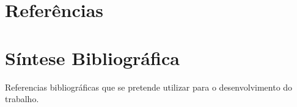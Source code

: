 \documentclass[
    12pt,               %
    a4paper,            %
    english,            %
    brazil,             %
    ]{article}
\begin{document}
\section{Referências}

    \vspace{-4.3em}
    \renewcommand\refname{}

    

\section{Síntese Bibliográfica}

Referencias bibliográficas que se pretende utilizar para o desenvolvimento do trabalho.


\end{document}
